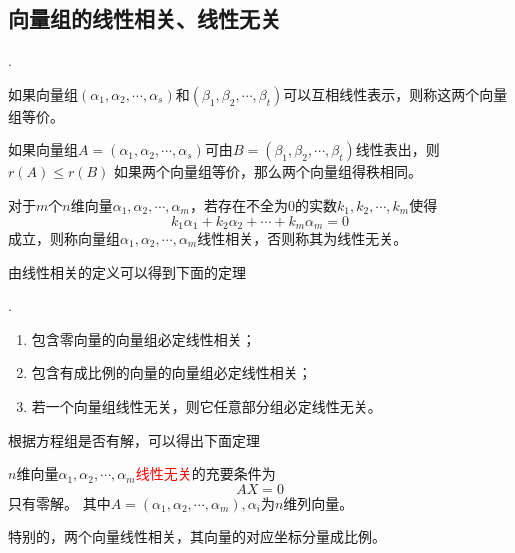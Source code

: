 \subsection{向量组的线性相关、线性无关}
.
\begin{theorem}
    如果向量组$(\alpha_1,\alpha_2,\cdots,\alpha_s)$和$(\beta_1,\beta_2,\cdots,\beta_t)$可以互相线性表示，则称这两个向量组等价。
\end{theorem}

\begin{theorem}
    如果向量组$A = (\alpha_1,\alpha_2,\cdots,\alpha_s)$可由$B = (\beta_1,\beta_2,\cdots,\beta_t)$线性表出，则$r(A)\leq r(B)$
    如果两个向量组等价，那么两个向量组得秩相同。
\end{theorem}

\begin{definition}
    对于$m$个$n$维向量$\alpha_1,\alpha_2,\cdots,\alpha_m$，若存在不全为$0$的实数$k_1,k_2,\cdots,k_m$使得
    \[ k_1\alpha_1 + k_2\alpha_2 + \cdots + k_m\alpha_m = 0 \]
    成立，则称向量组$\alpha_1,\alpha_2,\cdots,\alpha_m$线性相关，否则称其为线性无关。
\end{definition}
由线性相关的定义可以得到下面的定理
\begin{theorem}
    .
    \begin{enumerate}
        \item 包含零向量的向量组必定线性相关；
        \item 包含有成比例的向量的向量组必定线性相关；
        \item 若一个向量组线性无关，则它任意部分组必定线性无关。
    \end{enumerate}
\end{theorem}

根据方程组是否有解，可以得出下面定理
\begin{theorem}
    $n$维向量$\alpha_1,\alpha_2,\cdots,\alpha_m$\textcolor{red}{线性无关}的充要条件为
    \[AX=0\]
    只有零解。
    其中$A=(\alpha_1,\alpha_2,\cdots,\alpha_m),\alpha_i$为$n$维列向量。
\end{theorem}
特别的，两个向量线性相关，其向量的对应坐标分量成比例。

